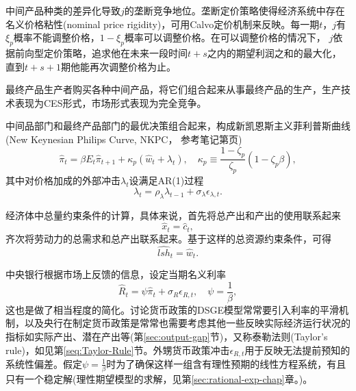 中间产品种类的差异化导致$j$的垄断竞争地位。垄断定价策略使得经济系统中存在名义价格粘性(nominal price rigidity)，可用Calvo定价机制来反映\citep{Calvo:1983uq}。每一期$t$，$j$有$\xi_{p}$概率不能调整价格，$1 - \xi_{p}$概率可以调整价格。在可以调整价格的情况下，
$j$依据前向型定价策略，追求他在未来一段时间$t+s$之内的期望利润之和的最大化，直到$t+s+1$期他能再次调整价格为止。

最终产品生产者购买各种中间产品，将它们组合起来从事最终产品的生产，生产技术表现为CES形式，市场形式表现为完全竞争。

中间品部门和最终产品部门的最优决策组合起来，构成新凯恩斯主义菲利普斯曲线(New Keynesian Philips Curve, NKPC， 参考笔记第\pageref{eq:log-lin-reset-price-inflation-gap}页)
\begin{equation}
  \label{eq:stylized-nkpc}
  \hat{\pi}_{t} = \beta E_{t} \hat{\pi}_{t+1}
  + \kappa_{p} \left( \hat{w}_{t} + \lambda_{t} \right), \quad \kappa_{p} \equiv \frac{1 - \zeta_{p}}{\zeta_{p}}\left( 1 - \zeta_{p} \beta \right),
\end{equation}
其中对价格加成的外部冲击$\lambda_{t}$设满足AR(1)过程
\begin{equation}
  \label{eq:stylized-shock-markup}
  \lambda_{t} = \rho_{\lambda} \lambda_{t-1} + \sigma_{\lambda} \epsilon_{\lambda,t}.
\end{equation}

经济体中总量约束条件的计算，具体来说，首先将总产出和产出的使用联系起来
\begin{equation}
  \label{eq:stylized-output-inandout}
  \hat{x}_{t} = \hat{c}_{t},
\end{equation}
齐次将劳动力的总需求和总产出联系起来。基于这样的总资源约束条件，可得
\begin{equation}
  \label{eq:stylized-agg-labor-w}
  \widehat{lsh}_{t} = \hat{w}_{t}.
\end{equation}

中央银行根据市场上反馈的信息，设定当期名义利率
\begin{equation}
  \label{eq:stylized-bank-rate}
  \hat{R}_{t} = \psi \hat{\pi}_{t} + \sigma_{R} \epsilon_{R,t}, \quad \psi = \frac{1}{\beta},
\end{equation}
这也是做了相当程度的简化。讨论货币政策的DSGE模型常常要引入利率的平滑机制，以及央行在制定货币政策是常常也需要考虑其他一些反映实际经济运行状况的指标如实际产出、潜在产出等(第\ref{sec:output-gap}节)，又称泰勒法则(Taylor's rule)，如见第\ref{seq:Taylor-Rule}节。外甥货币政策冲击$\epsilon_{R,t}$用于反映无法提前预知的系统性偏差。假定$\psi = \frac {1}{\beta}$时为了确保这样一组含有理性预期的线性方程系统，有且只有一个稳定解(理性期望模型的求解，见第\ref{sec:rational-exp-chap}章。)。

